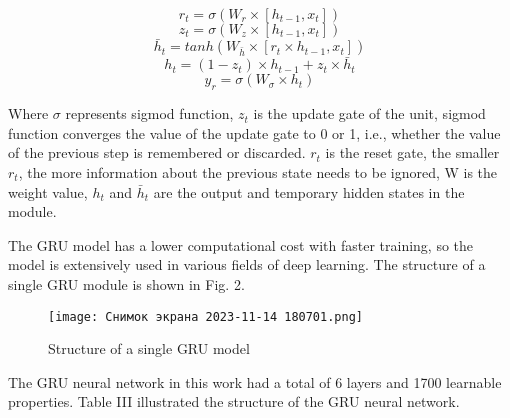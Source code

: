 

\renewcommand{\thetable}{\Roman{table}}
\captionsetup[table]{labelsep=newline, singlelinecheck = false, justification= centering}
\begin{equation}
r_t = \sigma (W_r × [h_{t-1}, x_t])
\end{equation}
\begin{equation}
z_t = \sigma (W_z × [h_{t-1}, x_t])
\end{equation}
\begin{equation}
\bar h_t = tanh(W_{\bar h} \times [r_t \times h_{t-1}, x_t])
\end{equation}
\begin{equation}
h_t = (1 - z_t) \times h_{t-1} + z_t \times \bar h_t
\end{equation} 
\begin{equation}
y_r = \sigma(W_\sigma \times h_t)
\end{equation}
\par
Where $\sigma$ represents sigmod function, $z_t$ is the update
gate of the unit, sigmod function converges the value
of the update gate to 0 or 1, i.e., whether the value of
the previous step is remembered or discarded. $r_t$ is the
reset gate, the smaller $r_t$, the more information about
the previous state needs to be ignored, W is the weight
value, $h_t$ and $\bar h_t$ are the output and temporary hidden
states in the module.
\par
The GRU model has a lower computational cost with
faster training, so the model is extensively used in various
fields of deep learning. The structure of a single GRU
module is shown in Fig. 2.

\setcounter{figure}{1}

\begin{figure}[!h]
\centering
\texttt{[image: Снимок экрана 2023-11-14 180701.png]}
\caption{Structure of a single GRU model}
\end{figure}

\par
The GRU neural network in this work had a total of 6
layers and 1700 learnable properties. Table III illustrated
the structure of the GRU neural network.

